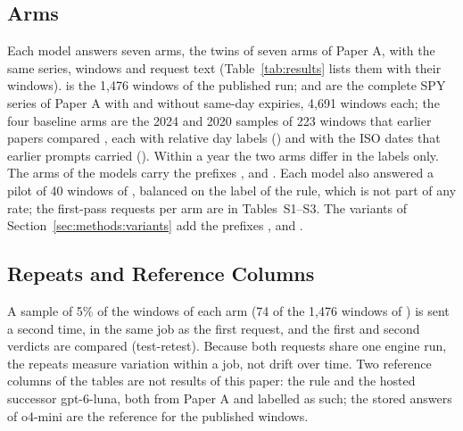 \subsection{Arms}
\label{sec:methods:arms}

Each model answers seven arms, the twins of seven arms of Paper A, with the same series, windows and request text (Table~\ref{tab:results} lists them with their windows).  is the 1{,}476 windows of the published run;  and  are the complete SPY series of Paper A with and without same-day expiries, 4{,}691 windows each; the four baseline arms are the 2024 and 2020 samples of 223 windows that earlier papers compared \cite{regan2026regimes}, each with relative day labels () and with the ISO dates that earlier prompts carried (). Within a year the two arms differ in the labels only. The arms of the models carry the prefixes ,  and . Each model also answered a pilot of 40 windows of , balanced on the label of the rule, which is not part of any rate; the first-pass requests per arm are in Tables~S1--S3. The variants of Section~\ref{sec:methods:variants} add the prefixes ,  and .


\subsection{Repeats and Reference Columns}
\label{sec:methods:repeats}

A sample of 5\% of the windows of each arm (74 of the 1{,}476 windows of ) is sent a second time, in the same job as the first request, and the first and second verdicts are compared (test-retest). Because both requests share one engine run, the repeats measure variation within a job, not drift over time. Two reference columns of the tables are not results of this paper: the rule and the hosted successor gpt-6-luna, both from Paper A and labelled as such; the stored answers of o4-mini are the reference for the published windows.

